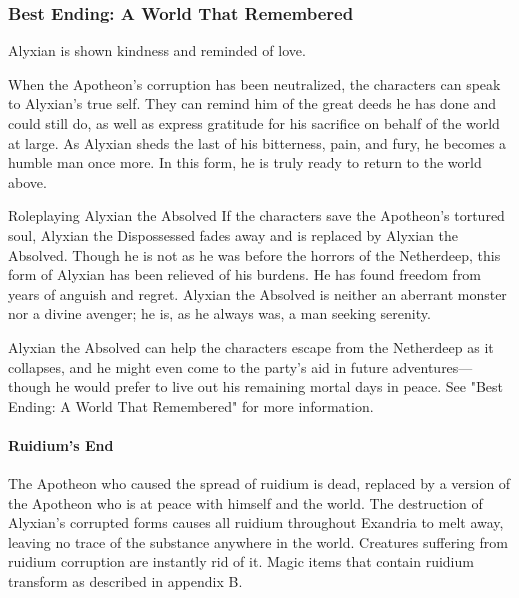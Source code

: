 \documentclass[10pt,a4paper,twoside,twocolumn,openany,nodeprecatedcode]{dndbook}
\begin{document}
\subsubsection{Best Ending: A World That Remembered}
Alyxian is shown kindness and reminded of love.

When the Apotheon's corruption has been neutralized, the characters can speak to Alyxian's true self. They can remind him of the great deeds he has done and could still do, as well as express gratitude for his sacrifice on behalf of the world at large. As Alyxian sheds the last of his bitterness, pain, and fury, he becomes a humble man once more. In this form, he is truly ready to return to the world above.

\begin{DndSidebar}[float=!b]{Roleplaying Alyxian the Absolved}
If the characters save the Apotheon's tortured soul, Alyxian the Dispossessed fades away and is replaced by Alyxian the Absolved. Though he is not as he was before the horrors of the Netherdeep, this form of Alyxian has been relieved of his burdens. He has found freedom from years of anguish and regret. Alyxian the Absolved is neither an aberrant monster nor a divine avenger; he is, as he always was, a man seeking serenity.



Alyxian the Absolved can help the characters escape from the Netherdeep as it collapses, and he might even come to the party's aid in future adventures—though he would prefer to live out his remaining mortal days in peace. See "Best Ending: A World That Remembered" for more information.



\end{DndSidebar}

\paragraph{Ruidium's End}
The Apotheon who caused the spread of ruidium is dead, replaced by a version of the Apotheon who is at peace with himself and the world. The destruction of Alyxian's corrupted forms causes all ruidium throughout Exandria to melt away, leaving no trace of the substance anywhere in the world. Creatures suffering from ruidium corruption are instantly rid of it. Magic items that contain ruidium transform as described in appendix B.
\end{document}
